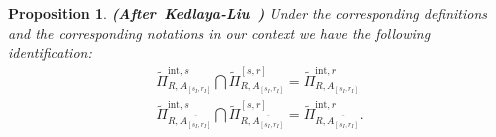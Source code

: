 \documentclass[12pt]{amsart}
\newtheorem{proposition}[theorem]{Proposition}
\theoremstyle{definition}
\numberwithin{equation}{section}
\begin{document}


\begin{proposition} \mbox{\bf{(After Kedlaya-Liu \cite[Lemma 5.2.6]{KL1})}} 
Under the corresponding definitions and the corresponding notations in our context we have the following identification:
\begin{align}
\widetilde{\Pi}^{\mathrm{int},s}_{R,A_{[s_I,r_I]}}\bigcap \widetilde{\Pi}^{[s,r]}_{R,A_{[s_I,r_I]}}=	\widetilde{\Pi}^{\mathrm{int},r}_{R,A_{[s_I,r_I]}}\\
\widetilde{\Pi}^{\mathrm{int},s}_{R,\overline{A_{[s_I,r_I]}}}\bigcap \widetilde{\Pi}^{[s,r]}_{R,\overline{A_{[s_I,r_I]}}}=	\widetilde{\Pi}^{\mathrm{int},r}_{R,\overline{A_{[s_I,r_I]}}}.
\end{align}
	
\end{proposition}
\end{document}
